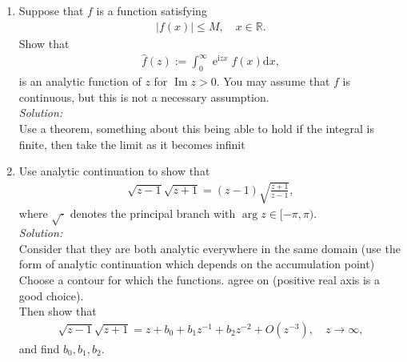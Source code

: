 \documentclass[10pt]{amsart}
\newcommand{\D}{\mathrm{d}}
\newcommand{\I}{\mathrm{i}}
\DeclareMathOperator{\E}{e}
\DeclareMathOperator{\imag}{Im}
\theoremstyle{nonumberplain}
\begin{document}
\begin{enumerate}[label={\bf {\arabic*}:}]
\item Suppose that $f$ is a function satisfying
  \begin{align*}
    |f(x)| \leq M, \quad x \in \mathbb R.
  \end{align*}
  Show that
  \begin{align*}
    \hat f(z) := \int_0^\infty \E^{\I z x} f(x) \D x,
  \end{align*}
  is an analytic function of $z$ for $\imag z > 0$.  You may assume
  that $f$ is continuous, but this is not a necessary assumption.\\
  
\noindent
\textit{Solution:} \\
Use a theorem, something about this being able to hold if the integral is finite, then take the limit as it becomes infinit
\newpage

\item Use analytic continuation to show that
  \begin{align*}
    \sqrt{z -1} \sqrt{z + 1} = (z -1) \sqrt{ \frac{ z +1}{z-1}},
  \end{align*}
  where $\sqrt{\cdot}$ denotes the principal branch with $\arg z \in
  [-\pi, \pi)$. \\
  \textit{Solution:} \\
  Consider that they are both analytic everywhere in the same domain (use the form of analytic continuation which depends on the accumulation point) \\
  Choose a contour for which the functions. agree on (positive real axis is a good choice). \\
  
  \noindent
  Then show that
  \begin{align*}
    \sqrt{z -1} \sqrt{z + 1} = z + b_0 + b_1 z^{-1} + b_2  z^{-2} +
    O(z^{-3}), \quad z \to \infty,
  \end{align*}
  and find $b_0,b_1,b_2$.
  
\end{enumerate}
\end{document}
